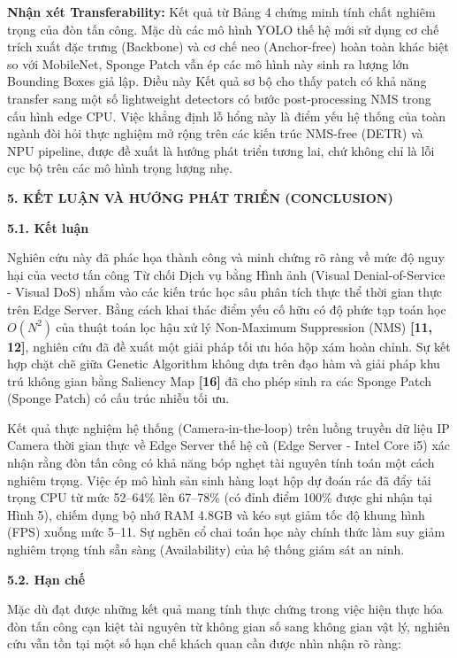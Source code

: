 \textbf{Nhận xét Transferability:} Kết quả từ Bảng 4 chứng minh tính
chất nghiêm trọng của đòn tấn công. Mặc dù các mô hình YOLO thế hệ mới
sử dụng cơ chế trích xuất đặc trưng (Backbone) và cơ chế neo
(Anchor-free) hoàn toàn khác biệt so với MobileNet, Sponge Patch vẫn ép
các mô hình này sinh ra lượng lớn Bounding Boxes giả lập. Điều này Kết
quả sơ bộ cho thấy patch có khả năng transfer sang một số lightweight
detectors có bước post-processing NMS trong cấu hình edge CPU. Việc
khẳng định lỗ hổng này là điểm yếu hệ thống của toàn ngành đòi hỏi thực
nghiệm mở rộng trên các kiến trúc NMS-free (DETR) và NPU pipeline, được
đề xuất là hướng phát triển tương lai, chứ không chỉ là lỗi cục bộ trên
các mô hình trọng lượng nhẹ.

\textbf{5. KẾT LUẬN VÀ HƯỚNG PHÁT TRIỂN (CONCLUSION)}

\textbf{5.1. Kết luận}

Nghiên cứu này đã phác họa thành công và minh chứng rõ ràng về mức độ
nguy hại của vectơ tấn công Từ chối Dịch vụ bằng Hình ảnh (Visual
Denial-of-Service - Visual DoS) nhắm vào các kiến trúc học sâu phân tích
thực thể thời gian thực trên Edge Server. Bằng cách khai thác điểm yếu
cố hữu có độ phức tạp toán học \(O\left( N^{2} \right)\ \)của thuật toán
lọc hậu xử lý Non-Maximum Suppression (NMS) \textbf{{[}11, 12{]}},
nghiên cứu đã đề xuất một giải pháp tối ưu hóa hộp xám hoàn chỉnh. Sự
kết hợp chặt chẽ giữa Genetic Algorithm không dựa trên đạo hàm và giải
pháp khu trú không gian bằng Saliency Map \textbf{{[}16{]}} đã cho phép
sinh ra các Sponge Patch (Sponge Patch) có cấu trúc nhiễu tối ưu.

Kết quả thực nghiệm hệ thống (Camera-in-the-loop) trên luồng truyền dữ
liệu IP Camera thời gian thực về Edge Server thế hệ cũ (Edge Server -
Intel Core i5) xác nhận rằng đòn tấn công có khả năng bóp nghẹt tài
nguyên tính toán một cách nghiêm trọng. Việc ép mô hình sản sinh hàng
loạt hộp dự đoán rác đã đẩy tải trọng CPU từ mức 52--64\% lên 67--78\%
(có đỉnh điểm 100\% được ghi nhận tại Hình 5), chiếm dụng bộ nhớ RAM
4.8GB và kéo sụt giảm tốc độ khung hình (FPS) xuống mức 5--11. Sự nghẽn
cổ chai toán học này chính thức làm suy giảm nghiêm trọng tính sẵn sàng
(Availability) của hệ thống giám sát an ninh.

\textbf{5.2. Hạn chế}

Mặc dù đạt được những kết quả mang tính thực chứng trong việc hiện thực
hóa đòn tấn công cạn kiệt tài nguyên từ không gian số sang không gian
vật lý, nghiên cứu vẫn tồn tại một số hạn chế khách quan cần được nhìn
nhận rõ ràng:

